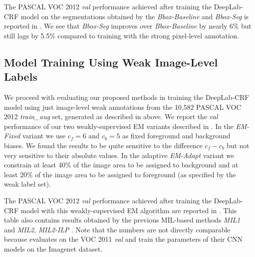 The PASCAL VOC 2012 \textsl{val} performance achieved after training
the DeepLab-CRF model on the segmentations obtained by the
\textsl{Bbox-Baseline} and \textsl{Bbox-Seg} is reported in
. We see that \textsl{Bbox-Seg} improves over
\textsl{Bbox-Baseline} by nearly 6\% but still lags by 5.5\% compared
to training with the strong pixel-level annotation.


\subsection{Model Training Using Weak Image-Level Labels}
\label{sec:test_image}

We proceed with evaluating our proposed methods in training the
DeepLab-CRF model using just image-level weak annotations from
the 10,582 PASCAL VOC 2012 \textsl{train\_aug} set, generated as
described in  above. We
report the \textsl{val} performance of our two weakly-supervised EM
variants described in . In the
\textsl{EM-Fixed} variant we use $c_f = 6$ and $c_b = 5$ as fixed
foreground and background biases. We found the results to be quite
sensitive to the difference $c_f-c_b$ but not very sensitive to their
absolute values. In the adaptive \textsl{EM-Adapt} variant we
constrain at least 40\% of the image area to be assigned to background
and at least 20\% of the image area to be assigned to foreground (as
specified by the weak label set). 

The PASCAL VOC 2012 \textsl{val} performance achieved after training
the DeepLab-CRF model with this weakly-supervised EM algorithm are
reported in . This table also contains results
obtained by the previous MIL-based methods \textsl{MIL1}
\citep{pathak2014fully} and \textsl{MIL2}, \textsl{MIL2-ILP}
\citep{pinheiro2014weakly}. Note that the numbers are not directly
comparable because \citet{pathak2014fully} evaluates on the VOC 2011
\textsl{val} and \citet{pinheiro2014weakly} train the parameters of
their CNN models on the Imagenet dataset. 

